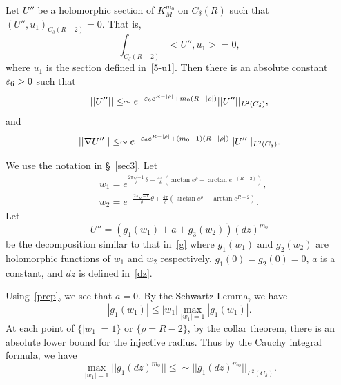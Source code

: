 \begin{lemma}\label{claim}
Let $U''$ be a holomorphic section of $K_M^{m_0}$ 
on $C_\delta(R)$
such that
$(U'',u_1)_{C_\delta(R-2)}=0$. That is,
\begin{equation}\label{prep}
\int_{C_\delta(R-2)} <U'',u_1>=0,
\end{equation}
where $u_1$ is the section defined in~\eqref{5-u1}. Then there
is an absolute constant $\varepsilon_6>0$ such that
\begin{equation}\label{5-n1}
||U''||\leq\sim e^{-\varepsilon_6e^{R-|\rho|}+m_0(R-|\rho|)}||U''||_{L^2
(C_\delta)},
\end{equation}
and
\begin{equation}\label{5-n2}
||\nabla U''||\leq
\sim e^{-\varepsilon_6e^{R-|\rho|}+(m_0+1)(R-|\rho|)}||U''||_{L^2
(C_\delta)}.
\end{equation}
\end{lemma}

We use the notation in \S ~\ref{sec3}. Let
\begin{align*}
& w_{1}=e^{\frac{2\pi\sqrt{-1}}{\delta}\theta
-\frac{4\pi}{\delta}
(\arctan e^{\rho}-\arctan e^{-(R-2)})},\\
& w_{2}=e^{-\frac{2\pi\sqrt{-1}}{\delta}\theta
+\frac{4\pi}{\delta}
(\arctan e^{\rho}-\arctan e^{R-2})}.
\end{align*}
Let   
\[
U''=(g_1(w_1)+a+g_3(w_2))(dz)^{m_0}
\]
be the decomposition similar to that in~\eqref{g} where
$g_1(w_1)$ and $g_2(w_2)$ are holomorphic functions of $w_1$ and
$w_2$ respectively, $g_1(0)=g_2(0)=0$, $a$ is a constant,
and $dz$ is defined in~\eqref{dz}.

Using~\eqref{prep}, we see that $a=0$. By the Schwartz Lemma, we have
\begin{equation}\label{sch}
|g_1(w_1)|\leq |w_1| \max_{|w_1|=1}|g_1(w_1)|.
\end{equation}
At each point of $\{|w_1|=1\}$ or $\{\rho=R-2\}$, by the collar theorem,
there is an
absolute lower bound for the injective radius. Thus by the 
Cauchy integral formula,
we have
\begin{equation}\label{5-8}
\max_{|w_1|=1}||g_1(dz)^{m_0}||\leq
\sim||g_1(dz)^{m_0}||_{L^2(C_\delta)}.
\end{equation}

